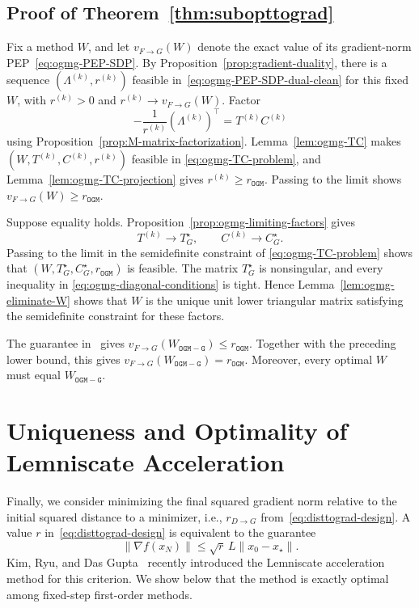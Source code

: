 \documentclass[11pt]{article}
\begin{document}
\subsection{Proof of Theorem~\ref{thm:subopttograd}}
Fix a method $W$, and let $v_{F\rightarrow G}(W)$ denote the exact value of its gradient-norm
PEP~\eqref{eq:ogmg-PEP-SDP}. By Proposition~\ref{prop:gradient-duality}, there is a sequence
$(\Lambda^{(k)},r^{(k)})$ feasible in~\eqref{eq:ogmg-PEP-SDP-dual-clean} for
this fixed $W$, with $r^{(k)}>0$ and $r^{(k)}\to v_{F\rightarrow G}(W)$. Factor
\[
    -\frac1{r^{(k)}}(\Lambda^{(k)})^\top=T^{(k)}C^{(k)}
\]
using Proposition~\ref{prop:M-matrix-factorization}. Lemma~\ref{lem:ogmg-TC}
makes $(W,T^{(k)},C^{(k)},r^{(k)})$ feasible in
\eqref{eq:ogmg-TC-problem}, and Lemma~\ref{lem:ogmg-TC-projection} gives
$r^{(k)}\geq r_\mathtt{OGM}$. Passing to the limit shows $v_{F\rightarrow G}(W)\geq r_\mathtt{OGM}$.

Suppose equality holds. Proposition~\ref{prop:ogmg-limiting-factors} gives
\[
    T^{(k)}\to T_G^\star,
    \qquad
    C^{(k)}\to C_G^\star.
\]
Passing to the limit in the semidefinite constraint of
\eqref{eq:ogmg-TC-problem} shows that
$(W,T_G^\star,C_G^\star,r_\mathtt{OGM})$ is feasible. The matrix
$T_G^\star$ is nonsingular, and every inequality in
\eqref{eq:ogmg-diagonal-conditions} is tight. Hence
Lemma~\ref{lem:ogmg-eliminate-W} shows that $W$ is the unique unit lower
triangular matrix satisfying the semidefinite constraint for these factors.

The guarantee in~\cite{KF21} gives $v_{F\rightarrow G}(W_\mathtt{OGM-G})\leq r_\mathtt{OGM}$.
Together with the preceding lower bound, this gives
$v_{F\rightarrow G}(W_\mathtt{OGM-G})=r_\mathtt{OGM}$. Moreover, every optimal $W$ must equal $W_\mathtt{OGM-G}$.




\section{Uniqueness and Optimality of Lemniscate Acceleration}\label{sec:lemni}

Finally, we consider minimizing the final squared gradient norm relative to the initial squared distance to a minimizer, i.e., $r_{D\rightarrow G}$ from~\eqref{eq:disttograd-design}. A value $r$ in~\eqref{eq:disttograd-design} is equivalent to the guarantee
\[
    \|\nabla f(x_N)\|
    \leq \sqrt r\,L\|x_0-x_\star\|.
\]
Kim, Ryu, and Das Gupta~\cite{KimRyuDasGupta26} recently introduced the Lemniscate acceleration method for this criterion. We show below that the method is exactly optimal among fixed-step first-order methods.
\end{document}
